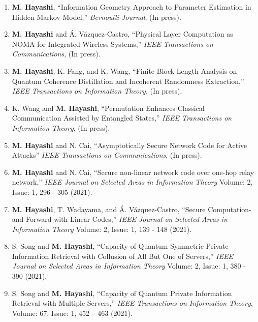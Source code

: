 \documentclass[a4paper,12pt,oneside]{article}
\begin{document}
\begin{enumerate}

\item
\textbf{M. Hayashi},
``Information Geometry Approach to Parameter Estimation in Hidden Markov Model,''
{\em Bernoulli Journal},
(In press).

\item
\textbf{M. Hayashi} and \'{A}. V\'{a}zquez-Castro,
``Physical Layer Computation as NOMA for Integrated Wireless Systems,''
{\em IEEE Transactions on Communications},
(In press).

\item
\textbf{M. Hayashi}, K. Fang, and K. Wang,
``Finite Block Length Analysis on Quantum Coherence Distillation and Incoherent Randomness Extraction,''
{\em IEEE Transactions on Information Theory},
(In press).

\item
K. Wang and \textbf{M. Hayashi},
``Permutation Enhances Classical Communication Assisted by Entangled States,''
{\em IEEE Transactions on Information Theory},
(In press).

\item
\textbf{M. Hayashi} and N. Cai,
``Asymptotically Secure Network Code for Active Attacks''
{\em IEEE Transactions on Communications},
(In press).

\item
\textbf{M. Hayashi} and N. Cai,
``Secure non-linear network code over one-hop relay network,''
{\em IEEE Journal on Selected Areas in Information Theory}
Volume: 2, Issue: 1, 296 - 305 (2021).

\item
\textbf{M. Hayashi}, T. Wadayama, and \'{A}. V\'{a}zquez-Castro,
``Secure Computation-and-Forward with Linear Codes,''
{\em IEEE Journal on Selected Areas in Information Theory}
Volume: 2, Issue: 1, 139 - 148 (2021).

\item
S. Song and \textbf{M. Hayashi},
``Capacity of Quantum Symmetric Private Information Retrieval with Collusion of All But One of Servers,''
{\em IEEE Journal on Selected Areas in Information Theory}
Volume: 2, Issue: 1, 380 - 390 (2021).

\item
S. Song and \textbf{M. Hayashi},
``Capacity of Quantum Private Information Retrieval with Multiple Servers,''
{\em IEEE Transactions on Information Theory}, 
Volume: 67, Issue: 1, 452 -- 463 (2021). 


\end{enumerate}
\end{document}
